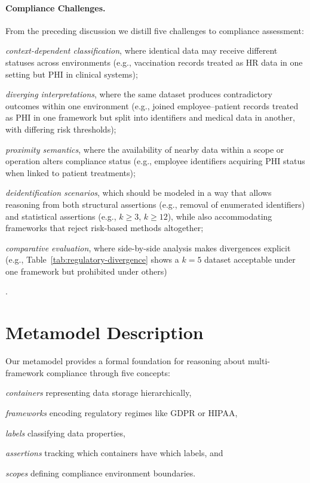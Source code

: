\documentclass[runningheads,oneside]{llncs}
\begin{document}
\paragraph{Compliance Challenges.}
From the preceding discussion we distill five challenges to compliance assessment:
\begin{enumerate*}[label=(\arabic*)]
  \item \emph{context-dependent classification}, where identical data may receive different statuses across environments (e.g., vaccination records treated as HR data in one setting but PHI in clinical systems);
  \item \emph{diverging interpretations}, where the same dataset produces contradictory outcomes within one environment (e.g., joined employee–patient records treated as PHI in one framework but split into identifiers and medical data in another, with differing risk thresholds);
  \item \emph{proximity semantics}, where the availability of nearby data within a scope or operation alters compliance status (e.g., employee identifiers acquiring PHI status when linked to patient treatments);
  \item \emph{de\-identification scenarios}, which should be modeled in a way that allows reasoning from both structural assertions (e.g., removal of enumerated identifiers) and statistical assertions (e.g., $k \geq 3$, $k \geq 12$), while also accommodating frameworks that reject risk-based methods altogether;
  \item \emph{comparative evaluation}, where side-by-side analysis makes divergences explicit (e.g., Table~\ref{tab:regulatory-divergence} shows a $k=5$ dataset acceptable under one framework but prohibited under others)
\end{enumerate*}.

\section{Metamodel Description}\label{sec:concepts}

Our metamodel provides a formal foundation for reasoning about multi-framework compliance through five concepts:
\begin{enumerate*}[label=(\roman*)]
\item \emph{containers} representing data storage hierarchically,
\item \emph{frameworks} encoding regulatory regimes like GDPR or HIPAA,
\item \emph{labels} classifying data properties,
\item \emph{assertions} tracking which containers have which labels, and
\item \emph{scopes} defining compliance environment boundaries.
\end{enumerate*}
\end{document}
